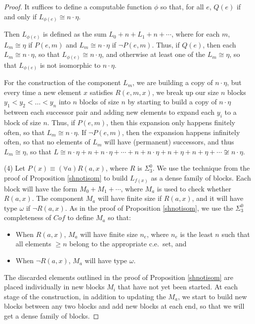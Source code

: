\documentclass[11pt]{amsart}
\theoremstyle{definition}
\begin{document}
\begin{proof}
It suffices to define a computable function $\phi$ so that, for all $e$, $Q(e)$ if and only if $L_{\phi(e)} \cong n \cdot \eta$.

Then $L_{\phi(e)}$ is defined as the sum $L_0 + n + L_1 + n +  \dotsb$, where for each $m$, $L_m \cong \eta$ if $P(e,m)$ and $L_m \cong n\cdot \eta$ if $\neg P(e,m)$. Thus, if $Q(e)$, then each $L_m \cong n \cdot \eta$, so that $L_{\phi(e)} \cong n \cdot \eta$, and otherwise at least one of the $L_m \cong \eta$, so that $L_{\phi(e)}$ is not isomorphic to $n \cdot \eta$. 

For the construction of the component $L_m$, we are building a copy of $n \cdot \eta$, but every time a new element $x$ satisfies $R(e,m,x)$, we break up our size $n$ blocks $y_1 < y_2 < \dots < y_n$ into $n$ blocks of size $n$ by starting to build a copy of $n \cdot \eta$ between each successor pair and adding new elements to expand each $y_i$ to a block of size $n$. Thus, if $P(e,m)$, then this expansion only happens finitely often, so that $L_m \cong n \cdot \eta$. 
If $\neg P(e,m)$, then the expansion happens infinitely often, so that no elements of $L_m$ will have (permanent) successors, and thus $L_m \cong \eta$, so that $L \cong n \cdot \eta + n + n \cdot \eta + \dotsb + n + n \cdot \eta + n + \eta + n + \eta + \cdots\not\cong n\cdot\eta$. 


\medskip

(4) Let $P(x) \equiv (\forall a)R(a,x)$, where $R$ is $\Sigma^0_3$. We use the technique from the proof of Proposition \ref{shnotisom} to build $L_{f(x)}$ as a dense family of blocks. Each block will have the form $M_0 + M_1 + \cdots$, where $M_a$ is used to check whether $R(a,x)$. The component $M_a$ will have finite size if $R(a,x)$, and it will have type $\omega$ if $\neg R(a,x)$. As in the proof of Proposition \ref{shnotisom}, we use the $\Sigma^0_3$ completeness of $Cof$ to define $M_a$ so that:

\begin{itemize}
\item 
 When $R(a,x)$, $M_a$ will have finite size $n_e$, where $n_e$ is the least $n$ such that all elements $\geq n$ belong to the appropriate c.e.\ set, and 

\item When $\neg R(a,x)$, $M_a$ will have type $\omega$. 
\end{itemize}

The discarded elements outlined in the proof of Proposition \ref{shnotisom} are placed individually in new blocks $M_i$ that have not yet been started. At each stage of the construction, in addition to updating the $M_a$, we start to build new blocks between any two blocks and add new blocks at each end, so that we will get a dense family of blocks. 


\end{proof}
\end{document}
